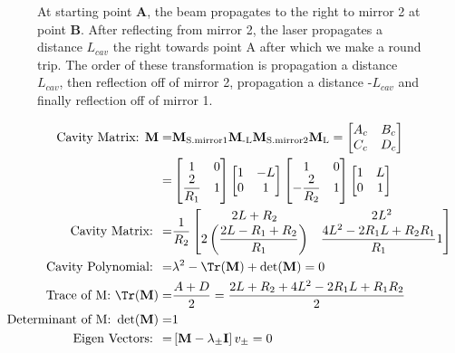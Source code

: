 \documentclass[11pt,a4paper]{book}
\newcommand{\imginput}[1]{} %
\begin{document}
		\begin{figure} [!ht]
		\centering
		\def\svgwidth{\columnwidth}
		\resizebox{150mm}{!}{\imginput{images/ABCD_cavity.pdf_tex}}
		\caption{At starting point \textbf{A}, the beam propagates to the right to mirror 2 at point \textbf{B}. After reflecting from mirror 2, the laser propagates a distance $L_{cav}$ the right towards point A after which we make a round trip. The order of these transformation is propagation a distance $L_{cav}$, then reflection off of mirror 2, propagation a distance -$L_{cav}$ and finally reflection off of mirror 1.}
		\label{fig:ABCD_cavity}
		\end{figure}
		
		\begin{equation}
		\label{eq:Cavity cascade matrix}
		\begin{split}
		\text{Cavity Matrix: }  \textbf{M} = & \textbf{M}_{\text{S.mirror1}}\textbf{M}_{\text{-L}} \textbf{M}_{\text{S.mirror2}} \textbf{M}_{\text{L}} =
		\begin{bmatrix} A_c & B_c \\ C_c & D_c   \end{bmatrix}\\ = & \begin{bmatrix} 1 & 0 \\ \dfrac{2}{R_1} & 1 \end{bmatrix} \begin{bmatrix} 1 & -L \\ 0 & 1 \end{bmatrix} \begin{bmatrix} 1 & 0 \\ -\dfrac{2}{R_2} & 1 \end{bmatrix} \begin{bmatrix} 1 & L \\ 0 & 1 \end{bmatrix} \\ 
		\text{Cavity Matrix: }  
		= & \frac{1}{R_2}\begin{bmatrix} 2L +R_2 & 2L^2 \\ 2\left( \dfrac{2L-R_1+R_2}{R_1}\right) & \dfrac{4L^2-2R_1L+R_2R_1}{R_1} 1 \end{bmatrix}\\
		\text{Cavity Polynomial: } = & \lambda^2 -\Tr(\textbf{M}) +\det(\textbf{M}) = 0 \\ 
		\text{Trace of M: }\Tr(\textbf{M}) = & \dfrac{A+D}{2} = \dfrac{2L+R_2 + 4L^2  - 2R_1L  + R_1R_2}{2} \\
		\text{Determinant of M: } \det(\textbf{M}) = & 1 \\
		\text{Eigen Vectors: } = & \left[\textbf{M}-\lambda_{\pm} \textbf{I}\right]v_{\pm} = 0 \\
		\end{split}
		\end{equation}
		
\end{document}
